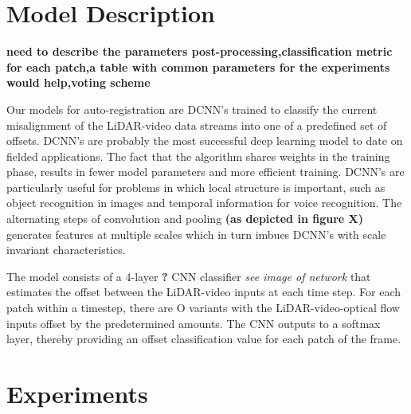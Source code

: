 \documentclass{article}
\begin{document}


\section{Model Description} %
\label{sec:model_description}

\textbf{need to describe the parameters post-processing,classification metric for each patch,a table with common parameters for the experiments would help,voting scheme}

Our models for auto-registration are DCNN's trained to classify the current misalignment of the LiDAR-video data streams into one of a predefined set of offsets. DCNN's are probably the most successful deep learning model to date on fielded applications. The fact that the algorithm shares weights in the training phase, results in fewer model parameters and more efficient training. DCNN's are particularly useful for problems in which local structure is important, such as object recognition in images and temporal information for voice recognition. The alternating steps of convolution and pooling \textbf{(as depicted in figure X)}  generates features at multiple scales which in turn imbues DCNN's with scale invariant characteristics.


The model consists of a 4-layer \textbf{?} CNN classifier \textit{see image of network} that estimates the offset between the LiDAR-video inputs at each time step. For each patch within a timestep, there are O variants with the LiDAR-video-optical flow inputs offset by the predetermined amounts. The CNN outputs to a softmax layer, thereby providing an offset classification value for each patch of the frame. 


\section{Experiments} %
\label{sec:experiments_and_post_processing}
\end{document}
